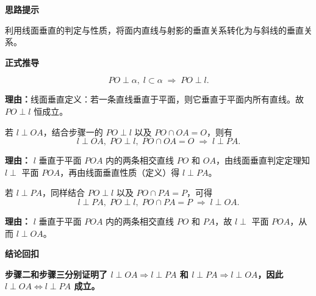 \begin{proofbox}

	\textbf{\textcolor{CProof}{思路提示}}

	利用线面垂直的判定与性质，将面内直线与射影的垂直关系转化为与斜线的垂直关系。

	\medskip
	\textbf{\textcolor{CProof}{正式推导}}
	\begin{description}[style=nextline, leftmargin=2.8em, labelsep=0.5em, itemsep=0.55em]
		\item[\textbf{步骤一（线面垂直基础）：}]
			\[
				PO\perp\alpha,\; l\subset\alpha \;\Rightarrow\; PO\perp l.
			\]
			\par\textbf{理由：}线面垂直定义：若一条直线垂直于平面，则它垂直于平面内所有直线。故 $PO\perp l$ 恒成立。

		\item[\textbf{步骤二（正向证明）：}]
			若 $l\perp OA$，结合步骤一的 $PO\perp l$ 以及 $PO\cap OA=O$，则有
			\[
				l\perp OA,\; PO\perp l,\; PO\cap OA=O \;\Rightarrow\; l\perp PA.
			\]
			\par\textbf{理由：} $l$ 垂直于平面 $POA$ 内的两条相交直线 $PO$ 和 $OA$，由线面垂直判定定理知 $l\perp$ 平面 $POA$，再由线面垂直性质（定义）得 $l\perp PA$。

		\item[\textbf{步骤三（逆向证明）：}]
			若 $l\perp PA$，同样结合 $PO\perp l$ 以及 $PO\cap PA=P$，可得
			\[
				l\perp PA,\; PO\perp l,\; PO\cap PA=P \;\Rightarrow\; l\perp OA.
			\]
			\par\textbf{理由：} $l$ 垂直于平面 $POA$ 内的两条相交直线 $PO$ 和 $PA$，故 $l\perp$ 平面 $POA$，从而 $l\perp OA$。
	\end{description}

	\medskip
	\textbf{\textcolor{CProof}{结论回扣}}

	\textbf{步骤二和步骤三分别证明了 $l\perp OA\Rightarrow l\perp PA$ 和 $l\perp PA\Rightarrow l\perp OA$，因此 $l\perp OA\iff l\perp PA$ 成立。}
\end{proofbox}
